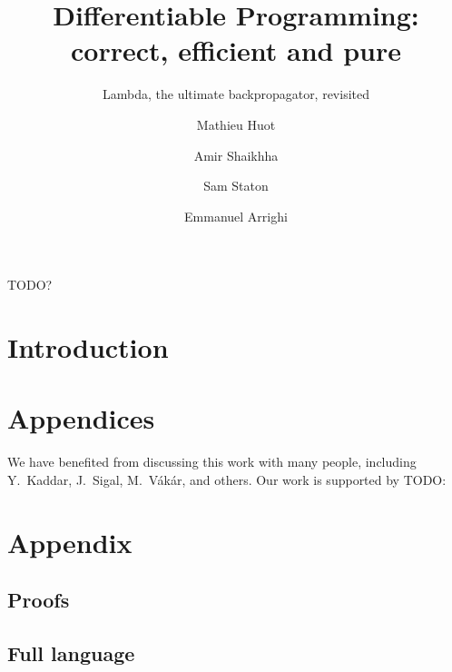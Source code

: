 \documentclass[acmsmall,review,anonymous]{acmart}\settopmatter{printfolios=true,printccs=false,printacmref=false}
\begin{document}
\title{Differentiable Programming: correct, efficient and pure}
\subtitle{Lambda, the ultimate backpropagator, revisited}

\author{Mathieu Huot}

\author{Amir Shaikhha}

\author{Sam Staton}

\author{Emmanuel Arrighi}

\renewcommand{\shortauthors}{Huot, et al.}



\begin{CCSXML}
TODO?
\end{CCSXML}


\maketitle

\section{Introduction}











\section{Appendices}

\begin{acks}
We have benefited from discussing this work with many people, including Y.~Kaddar, J.~Sigal, M.~V\'ak\'ar, and others. 
Our work is supported by TODO:
\end{acks}

\nocite{*}


\appendix
\section{Appendix}

\subsection{Proofs} %
\label{sub:proofs}

\subsection{Full language} %
\label{sub:full_language}
\end{document}
